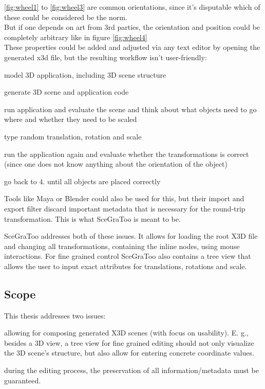 \ref{fig:wheel1} to \ref{fig:wheel3} are common orientations, since it's disputable which of these
could be considered be the norm.\\
But if one depends on art from 3rd parties, the orientation and position
could be completely arbitrary like in figure \ref{fig:wheel4}\\

These properties could be added and adjusted via any text editor by
opening the generated x3d file, but the resulting workflow isn't
user-friendly:

\begin{enumerate*}
  \item model 3D application, including 3D scene structure
  \item generate 3D scene and application code
  \item run application and evaluate the scene and think about what objects need to go where and whether they need to be scaled
  \item type random translation, rotation and scale
  \item run the application again and evaluate whether the transformations is correct (since one does not know anything about the orientation of the object)
  \item go back to 4. until all objects are placed correctly
\end{enumerate*}

Tools like Maya or Blender could also be used for this, but their import
and export filter discard important metadata that is necessary for the
round-trip transformation. This is what SceGraToo is meant to be.

SceGraToo addresses both of these issues. It allows for loading the root
X3D file and changing all transformations, containing the inline nodes,
using mouse interactions. For fine grained control SceGraToo also
contains a tree view that allows the user to input exact attributes for
translations, rotations and scale.

\subsection{Scope}\label{scope}

This thesis addresses two issues:

\begin{enumerate*}
  \item allowing for composing generated X3D scenes (with focus on usability). E. g., besides a 3D view, a tree view for fine grained editing should not only visualize the 3D scene's structure, but also allow for entering concrete coordinate values.
  \item during the editing process, the preservation of all information/metadata must be guaranteed.
\end{enumerate*}
